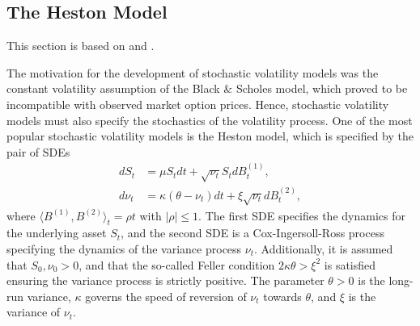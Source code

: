 \subsection{The Heston Model}
This section is based on \cite{heston} and \cite{heston2}.

The motivation for the development of stochastic volatility models was the constant volatility assumption of the Black \& Scholes model, which proved to be incompatible with observed market option prices. Hence, stochastic volatility models must also specify the stochastics of the volatility process. One of the most popular stochastic volatility models is the Heston model, which is specified by the pair of SDEs
\begin{align}
    dS_{t}&= \mu S_{t}dt + \sqrt{\nu_{t}}S_{t}dB_{t}^{(1)},\\
    d\nu_{t}&= \kappa(\theta - \nu_{t})dt + \xi\sqrt{\nu_{t}}dB_{t}^{(2)},
\end{align}
where $\langle B^{(1)},B^{(2)}\rangle_{t}=\rho t$ with $|\rho|\leq 1$. The first SDE specifies the dynamics for the underlying asset $S_{t}$, and the second SDE is a Cox-Ingersoll-Ross process specifying the dynamics of the variance process $\nu_{t}$. Additionally, it is assumed that $S_{0},\nu_{0}>0$, and that the so-called Feller condition $2\kappa\theta >\xi^{2}$ is satisfied ensuring the variance process is strictly positive. The parameter $\theta>0$ is the long-run variance, $\kappa$ governs the speed of reversion of $\nu_{t}$ towards $\theta$, and $\xi$ is the variance of $\nu_{t}$.

